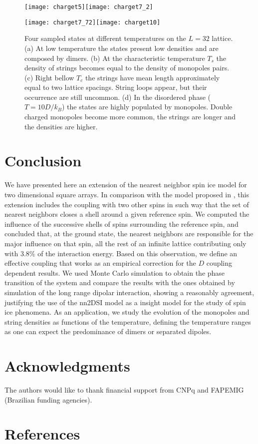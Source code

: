 \documentclass[aps,showkeys,groupedaddress]{revtex4}
\begin{document}
\begin{figure}[ht]
\begin{center}
\texttt{[image: charget5]}\texttt{[image: charget7\_2]}

\texttt{[image: charget7\_72]}\texttt{[image: charget10]}
\end{center}
\caption{Four sampled states at different temperatures on the $L=32$ lattice. (a) At low temperature the states present low densities and are composed by dimers. (b) At the characteristic temperature $T_s$ the density of strings becomes equal to the density of monopoles pairs. (c) Right bellow $T_c$ the strings have mean length approximately equal to two lattice spacings. String loops appear, but their occurrence are still uncommon. (d) In the disordered phase ($T=10 D/k_B$) the states are highly populated by monopoles. Double charged monopoles become more common, the strings are longer and the densities are higher.}
\label{figCharges}
\end{figure}


\section{Conclusion} \label{conclusions}

We have presented here an extension of the nearest neighbor spin ice model for two dimensional square arrays. In comparison with the model proposed in \cite{Xie2015}, this extension includes the coupling with two other spins in such way that the set of nearest neighbors closes a shell around a given reference spin. We computed the influence of the successive shells of spins surrounding the reference spin, and concluded that, at the ground state, the nearest neighbors are responsible for the major influence on that spin, all the rest of an infinite lattice contributing only with $3.8\%$ of the interaction energy. Based on this observation, we define an effective coupling that works as an empirical correction for the $D$ coupling dependent results. We used Monte Carlo simulation to obtain the phase transition of the system and compare the results with the ones obtained by simulation of the long range dipolar interaction, showing a reasonably agreement, justifying the use of the nn2DSI model as a insight model for the study of spin ice phenomena. As an application, we study the evolution of the monopoles and string densities as functions of the temperature, defining the temperature ranges as one can expect the predominance of dimers or separated dipoles.


\section*{Acknowledgments}
The authors would like to thank financial support from CNPq and FAPEMIG (Brazilian funding agencies).

\section*{References}
\end{document}
